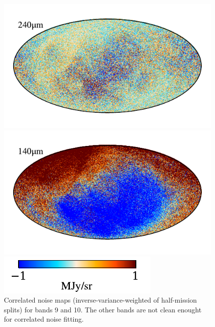 \documentclass{aa}
\begin{document}
\begin{figure}
	\centering
	\includegraphics{figs/ncorr_10_c0001_000022.pdf}
  \vspace{-1cm}
  
	\includegraphics{figs/ncorr_09_c0001_000022.pdf}
  \vspace{-0.2cm}
  
	\includegraphics[width=0.5\columnwidth]{figs/ncorr_cbar_c0001_000019.pdf}

	\caption{Correlated noise maps (inverse-variance-weighted of half-mission splits) for bands 9 and 10. The other bands are not clean enought for correlated noise fitting.}
	\label{fig:ncorr}
\end{figure}
\end{document}

